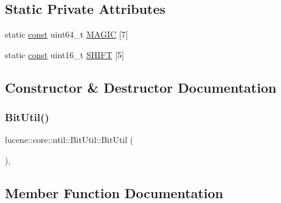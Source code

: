 \subsection*{Static Private Attributes}
\begin{DoxyCompactItemize}
\item 
static \mbox{\hyperlink{ZlibCrc32_8h_a2c212835823e3c54a8ab6d95c652660e}{const}} uint64\+\_\+t \mbox{\hyperlink{classlucene_1_1core_1_1util_1_1BitUtil_a1acafbe77ecb46b665ee3aab79c4bcbc}{M\+A\+G\+IC}} \mbox{[}7\mbox{]}
\item 
static \mbox{\hyperlink{ZlibCrc32_8h_a2c212835823e3c54a8ab6d95c652660e}{const}} uint16\+\_\+t \mbox{\hyperlink{classlucene_1_1core_1_1util_1_1BitUtil_a3c4343e3e66a7fde0097e102e0887eec}{S\+H\+I\+FT}} \mbox{[}5\mbox{]}
\end{DoxyCompactItemize}


\subsection{Constructor \& Destructor Documentation}
\mbox{\label{classlucene_1_1core_1_1util_1_1BitUtil_ad37aede44ae395f555529f558762573f}} 
\subsubsection{\texorpdfstring{Bit\+Util()}{BitUtil()}}
{\footnotesize\ttfamily lucene\+::core\+::util\+::\+Bit\+Util\+::\+Bit\+Util (\begin{DoxyParamCaption}{ }\end{DoxyParamCaption})\hspace{0.3cm}{\ttfamily [inline]}, {\ttfamily [private]}}



\subsection{Member Function Documentation}
\mbox{\label{classlucene_1_1core_1_1util_1_1BitUtil_aa1592874b73e75ec582c9419026ad678}} 
